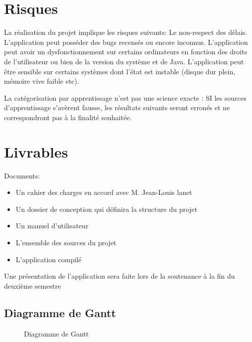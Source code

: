 \documentclass[a4paper, 12pt, twoside]{article}
\begin{document}
\section{Risques}
La réalisation du projet implique les risques suivants:
Le non-respect des délais.
L’application peut posséder des bugs recensés ou encore inconnus.
L’application peut avoir un dysfonctionnement sur certains ordinateurs en fonction des droits de l’utilisateur ou bien de la version du système et de Java.
L’application peut être sensible sur certains systèmes dont l’état est instable (disque dur plein, mémoire vive faible etc).

La catégorisation par apprentissage n’est pas une science exacte : SI les sources d’apprentissage s’avèrent fausse, les résultats suivants seront erronés et ne correspondront pas à la finalité souhaitée.

\section{Livrables}
Documents:
\begin{itemize}
\item Un cahier des charges en accord avec M. Jean-Louis lanet
\item Un dossier de conception qui définira la structure du projet
\item Un manuel d’utilisateur
\item L’ensemble des sources du projet
\item L’application compilé
\end{itemize}
Une présentation de l’application sera faite lors de la soutenance à la fin du deuxième semestre

\subsection{Diagramme de Gantt}

\begin{figure}[h]
  \caption{Diagramme de Gantt}
\end{figure}
\newpage
\end{document}

